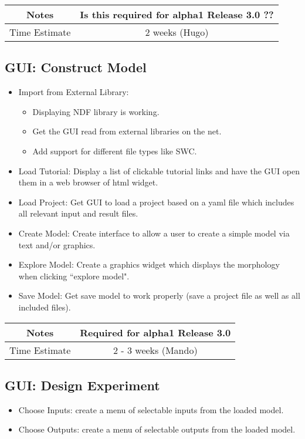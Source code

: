 \documentclass[12pt]{article}
\begin{document}
{
  \vspace{5mm}
  \centering
  \begin{tabular}{|c|c|}
    \hline
    Notes
    & Is this required for alpha1 Release 3.0 ?? \\
    \hline
    Time Estimate
    & 2 weeks (Hugo) \\
    \hline
  \end{tabular}
}


\subsection{GUI: Construct Model}

\begin{itemize}
\item Import from External Library:
  \begin{itemize}
  \item Displaying NDF library is working.
  \item Get the GUI read from external libraries on the net.
  \item Add support for different file types like SWC.
  \end{itemize}
\item Load Tutorial: Display a list of clickable tutorial links and
  have the GUI open them in a web browser of html widget.
\item Load Project: Get GUI to load a project based on a yaml file
  which includes all relevant input and result files.
\item Create Model: Create interface to allow a user to create a
  simple model via text and/or graphics.
\item Explore Model: Create a graphics widget which displays the
  morphology when clicking ``explore model".
\item Save Model: Get save model to work properly (save a project file
  as well as all included files).
\end{itemize}

{
  \vspace{5mm}
  \centering
  \begin{tabular}{|c|c|}
    \hline
    Notes
    & Required for alpha1 Release 3.0 \\
    \hline
    Time Estimate
    & 2 - 3 weeks (Mando) \\
    \hline
  \end{tabular}
}


\subsection{GUI: Design Experiment}
\begin{itemize}
\item Choose Inputs: create a menu of selectable inputs from the loaded model.
\item Choose Outputs: create a menu of selectable outputs from the loaded model.
\end{itemize}
\end{document}
